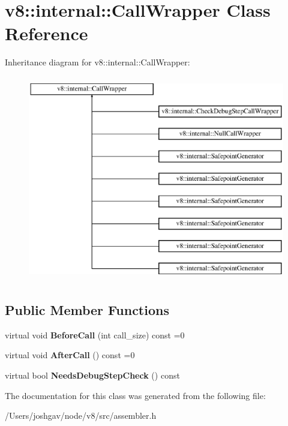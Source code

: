 \hypertarget{classv8_1_1internal_1_1_call_wrapper}{}\section{v8\+:\+:internal\+:\+:Call\+Wrapper Class Reference}
\label{classv8_1_1internal_1_1_call_wrapper}
Inheritance diagram for v8\+:\+:internal\+:\+:Call\+Wrapper\+:\begin{figure}[H]
\begin{center}
\leavevmode
\includegraphics[height=9.000000cm]{classv8_1_1internal_1_1_call_wrapper}
\end{center}
\end{figure}
\subsection*{Public Member Functions}
\begin{DoxyCompactItemize}
\item 
virtual void {\bfseries Before\+Call} (int call\+\_\+size) const  =0\hypertarget{classv8_1_1internal_1_1_call_wrapper_a36f25317e26079afd411e03e3d82a04c}{}\label{classv8_1_1internal_1_1_call_wrapper_a36f25317e26079afd411e03e3d82a04c}

\item 
virtual void {\bfseries After\+Call} () const  =0\hypertarget{classv8_1_1internal_1_1_call_wrapper_af3778681af03b380b4faa920382c9dee}{}\label{classv8_1_1internal_1_1_call_wrapper_af3778681af03b380b4faa920382c9dee}

\item 
virtual bool {\bfseries Needs\+Debug\+Step\+Check} () const \hypertarget{classv8_1_1internal_1_1_call_wrapper_adbbdb7925ac3bd19fb3d43d565875754}{}\label{classv8_1_1internal_1_1_call_wrapper_adbbdb7925ac3bd19fb3d43d565875754}

\end{DoxyCompactItemize}


The documentation for this class was generated from the following file\+:\begin{DoxyCompactItemize}
\item 
/\+Users/joshgav/node/v8/src/assembler.\+h\end{DoxyCompactItemize}

